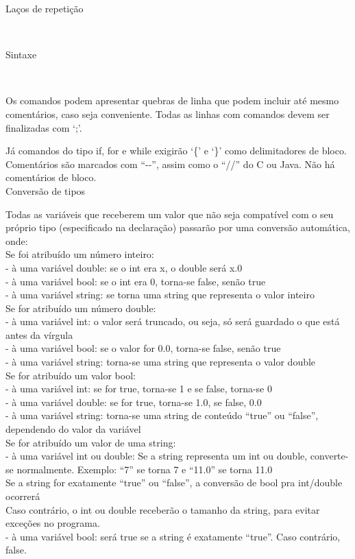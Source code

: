 \documentclass[12pt,a4paper]{article}
\begin{document}
\hypertarget{label5}{\Large{Laços de repetição}}\\[0.3cm]
\normalsize


\hypertarget{label6}{\Large{Sintaxe}}\\[0.3cm]
\normalsize

Os comandos podem apresentar quebras de linha que podem incluir até mesmo comentários, caso seja conveniente. Todas as linhas com comandos devem ser finalizadas com `;'.

Já comandos do tipo if, for e while exigirão `\{' e `\}' como delimitadores de bloco.
Comentários são marcados com ``-{}-'', assim como o ``//'' do C ou Java. Não há comentários de bloco.\\

\hypertarget{label8}{\Large{Conversão de tipos}}\\[0.3cm]
\normalsize

Todas as variáveis que receberem um valor que não seja compatível com o seu próprio tipo (especificado na declaração) passarão por uma conversão automática, onde: \\

Se foi atribuído um número inteiro:\\
- à uma variável double: se o int era x, o double será x.0\\
- à uma variável bool: se o int era 0, torna-se false, senão true\\
- à uma variável string: se torna uma string que representa o valor inteiro\\[0.3cm]

Se for atribuído um número double:\\
- à uma variável int: o valor será truncado, ou seja, só será guardado o que está antes da vírgula\\
- à uma variável bool: se o valor for 0.0, torna-se false, senão true\\
- à uma variável string: torna-se uma string que representa o valor double\\[0.3cm]

Se for atribuído um valor bool:\\
- à uma variável int: se for true, torna-se 1 e se false, torna-se 0\\
- à uma variável double: se for true, torna-se 1.0, se false, 0.0\\
- à uma variável string: torna-se uma string de conteúdo ``true'' ou ``false'', dependendo do valor da variável\\[0.3cm]

Se for atribuído um valor de uma string:\\
- à uma variável int ou double: Se a string representa um int ou double, converte-se normalmente. Exemplo: ``7'' se torna 7 e ``11.0'' se torna 11.0\\
Se a string for exatamente ``true'' ou ``false'', a conversão de bool pra int/double ocorrerá\\
Caso contrário, o int ou double receberão o tamanho da string, para evitar exceções no programa.\\
- à uma variável bool: será true se a string é exatamente ``true''. Caso contrário, false.\\
\end{document}
